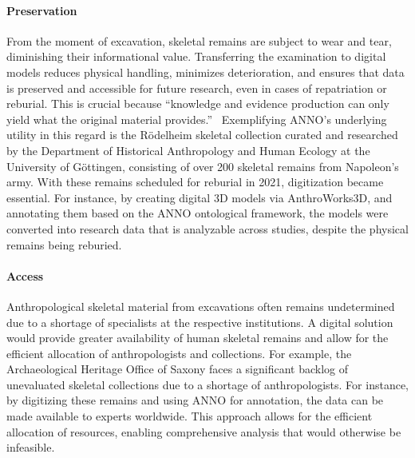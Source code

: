 \documentclass[sw]{iosart2x}
\begin{document}
\begin{enumerate}
\paragraph{Preservation}\label{sec:preserve}
From the moment of excavation, skeletal remains are subject to wear and tear, diminishing their informational value.
Transferring the examination to digital models reduces physical handling, minimizes deterioration, and ensures that data is preserved and accessible for future research, even in cases of repatriation or reburial.
This is crucial because \enquote{knowledge and evidence production can only yield what the original material provides.}~\cite{HeuschkelSchmiedelLabudde2024}
Exemplifying ANNO's underlying utility in this regard is the Rödelheim skeletal collection curated and researched by the Department of Historical Anthropology and Human Ecology at the University of Göttingen, consisting of over 200 skeletal remains from Napoleon's army.
With these remains scheduled for reburial in 2021, digitization became essential.
For instance, by creating digital 3D models via AnthroWorks3D, and annotating them based on the ANNO ontological framework, the models were converted into research data that is analyzable across studies, despite the physical remains being reburied.

\paragraph{Access}\label{sec:access}
Anthropological skeletal material from excavations often remains undetermined due to a shortage of specialists at the respective institutions.
A digital solution would provide greater availability of human skeletal remains and allow for the efficient allocation of anthropologists and collections.
For example, the Archaeological Heritage Office of Saxony faces a significant backlog of unevaluated skeletal collections due to a shortage of anthropologists.
For instance, by digitizing these remains and using ANNO for annotation, the data can be made available to experts worldwide.
This approach allows for the efficient allocation of resources, enabling comprehensive analysis that would otherwise be infeasible.


\end{enumerate}
\end{document}
